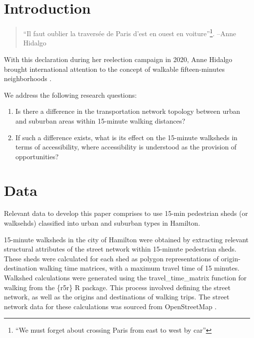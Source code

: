 \documentclass[preprint, 3p,
authoryear]{elsarticle} %
\providecommand{\tightlist}{%
  \setlength{\itemsep}{0pt}\setlength{\parskip}{0pt}}
\begin{document}
\section{Introduction}\label{introduction}

\begin{quote}
``Il faut oublier la traversée de Paris d'est en ouest en
voiture''\footnote{ ``We must forget about crossing Paris from east to
  west by car''}. --Anne Hidalgo
\end{quote}

With this declaration during her reelection campaign in 2020, Anne
Hidalgo brought international attention to the concept of walkable
fifteen-minutes neighborhoods \citep{alimi2020}.

\citet{knight2018walkable} \citet{liu2022toward}
\citet{pozoukidou2021fifteen} \citet{weng2019fifteen}

We address the following research questions:

\begin{enumerate}
\def\labelenumi{\arabic{enumi}.}
\tightlist
\item
  Is there a difference in the transportation network topology between
  urban and suburban areas within 15-minute walking distances?
\item
  If such a difference exists, what is its effect on the 15-minute
  walksheds in terms of accessibility, where accessibility is understood
  as the provision of opportunities?
\end{enumerate}

\section{Data}\label{data}

Relevant data to develop this paper comprises to use 15-min pedestrian
sheds (or walksehds) classified into urban and suburban types in
Hamilton.

15-minute walksheds in the city of Hamilton were obtained by extracting
relevant structural attributes of the street network within 15-minute
pedestrian sheds. These sheds were calculated for each shed as polygon
representations of origin-destination walking time matrices, with a
maximum travel time of 15 minutes. Walkshed calculations were generated
using the travel\_time\_matrix function for walking from the \{r5r\} R
package. This process involved defining the street network, as well as
the origins and destinations of walking trips. The street network data
for these calculations was sourced from OpenStreetMap
\citet{OpenStreetMap2023}.\\
\end{document}
